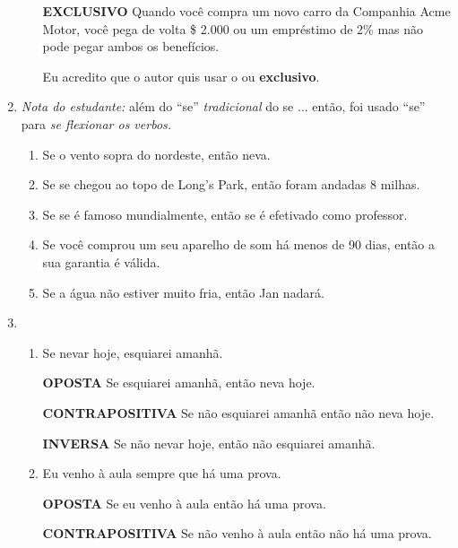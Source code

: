 \documentclass[12pt]{article}
\begin{document}
\begin{enumerate}
\begin{enumerate}
                \textbf{EXCLUSIVO}  Quando você compra um novo carro da Companhia Acme Motor, você pega de volta \$ 2.000 ou um empréstimo de 2\% mas não pode pegar ambos os benefícios.

                Eu acredito que o autor quis usar o ou \textbf{exclusivo}. 
        \end{enumerate}
    \item \textit{Nota do estudante:} além do ``se'' \textit{tradicional} do se ... então, foi usado ``se'' para \textit{se flexionar os verbos.}
        \begin{enumerate}
            \item Se o vento sopra do nordeste, então neva.
            \item Se se chegou ao topo de Long's Park, então foram andadas 8 milhas.
            \item Se se é famoso mundialmente, então se é efetivado como professor. 
            \item Se você comprou um seu aparelho de som há menos de 90 dias, então a sua garantia é válida.
            \item Se a água não estiver muito fria, então Jan nadará.
        \end{enumerate}
    \item 
        \begin{enumerate}
            \item Se nevar hoje, esquiarei amanhã.

                \textbf{OPOSTA} Se esquiarei amanhã, então neva hoje.

                \textbf{CONTRAPOSITIVA} Se não esquiarei amanhã então não neva hoje.

                \textbf{INVERSA} Se não nevar hoje, então não esquiarei amanhã.

            \item Eu venho à aula sempre que há uma prova.

                \textbf{OPOSTA} Se eu venho à aula então há uma prova.

                \textbf{CONTRAPOSITIVA} Se não venho à aula então não há uma prova.


\end{enumerate}
\end{enumerate}
\end{document}
